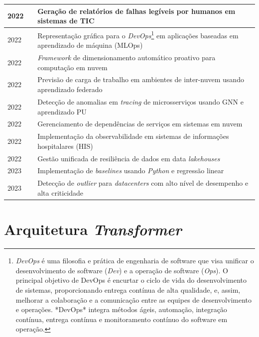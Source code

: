 \begin{longtable}{|p{2.5cm}|p{4cm}|p{8cm}|}
2022              & \cite{9789784}  & Geração de relatórios de falhas legíveis por humanos em sistemas de TIC                       \\ \hline
2022              & \cite{9825776}  & Representação gráfica para o \textit{DevOps}\footnote{\textit{DevOps} é uma filosofia e prática de engenharia de software que visa unificar o desenvolvimento de software (\textit{Dev}) e a operação de software (\textit{Ops}). O principal objetivo de DevOps é encurtar o ciclo de vida do desenvolvimento de sistemas, proporcionando entrega contínua de alta qualidade, e, assim, melhorar a colaboração e a comunicação entre as equipes de desenvolvimento e operações. *DevOps* integra métodos ágeis, automação, integração contínua, entrega contínua e monitoramento contínuo do software em operação.}
 em aplicações baseadas em aprendizado de máquina (MLOps)  \\ \hline
2022              & \cite{9835411}  & \textit{Framework} de dimensionamento automático proativo para computação em nuvem                     \\ \hline
2022              & \cite{9892264}  & Previsão de carga de trabalho em ambientes de inter-nuvem usando aprendizado federado         \\ \hline
2022              & \cite{9978983}  & Detecção de anomalias em \textit{tracing} de microsserviços usando GNN e aprendizado PU                \\ \hline
2022              & \cite{9985105}  & Gerenciamento de dependências de serviços em sistemas em nuvem                                \\ \hline
2022              & \cite{10004053} & Implementação da observabilidade em sistemas de informações hospitalares (HIS)                \\ \hline
2022              & \cite{10020986} & Gestão unificada de resiliência de dados em data \textit{lakehouses}                                   \\ \hline
2023              & \cite{10098585} & Implementação de \textit{baselines} usando \textit{Python} e regressão linear                                   \\ \hline
2023              & \cite{10113794} & Detecção de \textit{outlier} para \textit{datacenters} com alto nível de desempenho e alta criticidade          \\ \hline
\end{longtable}


\section{Arquitetura \textit{Transformer}} \label{sec-arquitetura-transformer}

